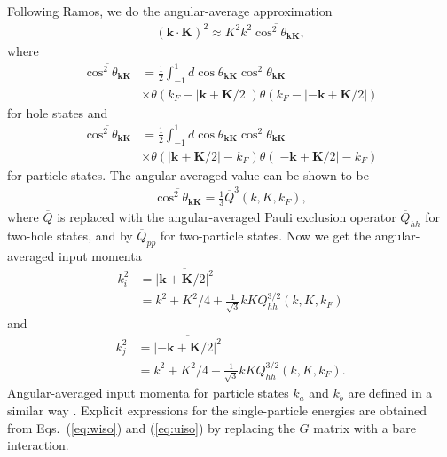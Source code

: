 \documentclass[a4paper,12pt]{report}
\begin{document}
Following Ramos, we do the angular-average approximation
\begin{align}
  (\mathbf{k}\cdot \mathbf{K})^{2} \approx K^{2}k^{2}\overline{\cos^{2}\theta_{\mathbf{k}\mathbf{K}}} ,
\end{align}
where
\begin{align}
  \overline{ \cos^{2}\theta_{\mathbf{k}\mathbf{K}}} &= \frac{1}{2}\int_{-1}^{1}d\cos \theta_{\mathbf{k}\mathbf{K}} \cos^{2}\theta_{\mathbf{k}\mathbf{K}} \nonumber \\
  & \times \theta(k_{F}-|\mathbf{k}+\mathbf{K}/2|)\theta(k_{F}-|-\mathbf{k}+\mathbf{K}/2|)
\end{align}
for hole states and
\begin{align}
  \overline{ \cos^{2}\theta_{\mathbf{k}\mathbf{K}}} &= \frac{1}{2}\int_{-1}^{1}d\cos \theta_{\mathbf{k}\mathbf{K}} \cos^{2}\theta_{\mathbf{k}\mathbf{K}} \nonumber \\
  & \times \theta(|\mathbf{k}+\mathbf{K}/2|-k_{F})\theta(|-\mathbf{k}+\mathbf{K}/2|-k_{F})
\end{align}
for particle states. The angular-averaged value can be shown to be 
\begin{align}
  \overline{ \cos^{2}\theta_{\mathbf{k}\mathbf{K}}} = \frac{1}{3}\overline{Q}^{3}(k, K, k_{F}),
\end{align}
where $\overline{Q}$ is replaced with the angular-averaged Pauli exclusion operator $\overline{Q}_{hh}$ for two-hole states, and by $\overline{Q}_{pp}$ for two-particle states. Now we get the angular-averaged input momenta
\begin{align}
  k_{i}^{2} &= \overline{|\mathbf{k}+\mathbf{K}/2|^{2}} \nonumber \\
  & = k^{2} + K^{2}/4 + \frac{1}{\sqrt{3}}kKQ_{hh}^{3/2}(k, K, k_{F})
  \label{eq:ki_ave}
\end{align} 
and
\begin{align}
  k_{j}^{2} &= \overline{|-\mathbf{k}+\mathbf{K}/2|^{2}} \nonumber \\
  & = k^{2} + K^{2}/4 - \frac{1}{\sqrt{3}}kKQ_{hh}^{3/2}(k, K, k_{F}).
  \label{eq:kj_ave}
\end{align}
Angular-averaged input momenta for particle states $k_{a}$ and $k_{b}$
are defined in a similar way \cite{ramos_phd}. Explicit expressions
for the single-particle energies are obtained from Eqs.~(\ref{eq:wiso})
and (\ref{eq:uiso}) by replacing the $G$ matrix with a bare interaction.
\end{document}
